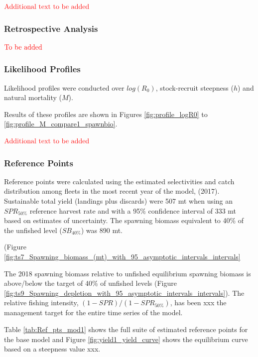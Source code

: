 \documentclass[12pt,]{article}
\begin{document}
\textbf{\(\color{red}{\text{Additional text to be added}}\)}

\hypertarget{retrospective-analysis}{%
\subsubsection{Retrospective Analysis}\label{retrospective-analysis}}

\textbf{\(\color{red}{\text{To be added}}\)}

\hypertarget{likelihood-profiles}{%
\subsubsection{Likelihood Profiles}\label{likelihood-profiles}}

Likelihood profiles were conducted over \(log(R_0)\), stock-recruit
steepness (\(h\)) and natural mortality (\(M\)).

Results of these profiles are shown in Figures \ref{fig:profile_logR0}
to \ref{fig:profile_M_compare1_spawnbio}.

\textbf{\(\color{red}{\text{Additional text to be added}}\)}

\hypertarget{reference-points-1}{%
\subsubsection{Reference Points}\label{reference-points-1}}

Reference points were calculated using the estimated selectivities and
catch distribution among fleets in the most recent year of the model,
(2017). Sustainable total yield (landings plus discards) were 507 mt
when using an \(SPR_{50\%}\) reference harvest rate and with a 95\%
confidence interval of 333 mt based on estimates of uncertainty. The
spawning biomass equivalent to 40\% of the unfished level
(\(SB_{40\%}\)) was 890 mt.

(Figure
\ref{fig:ts7_Spawning_biomass_(mt)_with_95_asymptotic_intervals_intervals}

The 2018 spawning biomass relative to unfished equilibrium spawning
biomass is above/below the target of 40\% of unfished levels (Figure
\ref{fig:ts9_Spawning_depletion_with_95_asymptotic_intervals_intervals}).
The relative fishing intensity, \((1-SPR)/(1-SPR_{50\%})\), has been xxx
the management target for the entire time series of the model.

Table \ref{tab:Ref_pts_mod1} shows the full suite of estimated reference
points for the base model and Figure \ref{fig:yield1_yield_curve} shows
the equilibrium curve based on a steepness value xxx.
\end{document}
